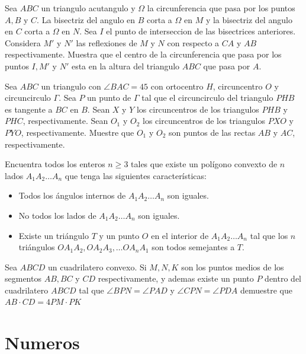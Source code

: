 \documentclass[11pt]{scrartcl}
\begin{document}
\begin{problem}
[2018/6] Sea $ABC$ un triangulo acutangulo y $\Omega$ la circunferencia que pasa por los puntos $A,B$ y $C$. La bisectriz del angulo en $B$ corta a $\Omega$ en $M$ y la bisectriz del angulo en $C$ corta a $\Omega$ en $N$. Sea $I$ el punto de interseccion de las bisectrices anteriores. Considera $M'$ y $N'$ las reflexiones de $M$ y $N$ con respecto a $CA$ y $AB$ respectivamente. Muestra que el centro de la circunferencia que pasa por los puntos $I,M'$ y $N'$ esta en la altura del triangulo $ABC$ que pasa por $A$.
\end{problem}

\begin{problem}
[2019/6] Sea $ABC$ un triangulo con $\angle{BAC}=45$ con ortocentro $H$, circuncentro $O$ y circuncirculo $\Gamma$. Sea $P$ un punto de $\Gamma$ tal que el circuncirculo del triangulo $PHB$ es tangente a $BC$ en $B$. Sean $X$ y $Y$ los circuncentros de los triangulos $PHB$ y $PHC$, respectivamente. Sean $O_1$ y $O_2$ los circuncentros de los triangulos $PXO$ y $PYO$, respectivamente. Muestre que $O_1$ y $O_2$ son puntos de las rectas $AB$ y $AC$, respectivamente.
\end{problem}

\begin{problem}
    [2022/6] 
    Encuentra todos los enteros $n\geq 3$ tales que existe un polígono convexto de $n$ lados $A_1A_2\dots A_n$ que tenga las siguientes características:
 \begin{itemize} 
 \item  Todos los ángulos internos de $A_1A_2\dots A_n$ son iguales. 
 \item  No todos los lados de $A_1A_2\dots A_n$ son iguales.
 \item  Existe un triángulo $T$ y un punto $O$ en el interior de $A_1A_2\dots A_n$ tal que los $n$ triángulos $OA_1A_2, OA_2A_3,\dots OA_nA_1$ son todos semejantes a $T$.
 \end{itemize} 
\end{problem}
\begin{problem} [2023/3]
    Sea $ABCD$ un cuadrilatero convexo. Si $M,N,K$ son los puntos medios de los segmentos $AB,BC$ y $CD$ respectivamente, y ademas existe un punto $P$ dentro del cuadrilatero $ABCD$ tal que $\angle BPN =\angle PAD$ y $\angle CPN=\angle PDA$ demuestre que $AB\cdot CD =4PM \cdot PK$
\end{problem}
\section{Numeros}
\end{document}

